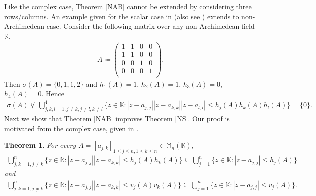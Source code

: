 \documentclass{amsart}
\newtheorem{theorem}{Theorem}[section]
\begin{document}
Like the complex case, Theorem \ref{NAB} cannot be extended by considering three rows/columns. An example given for the scalar case in \cite{VARGA} (also see \cite{NEWMANTHOMPSON, BRUALDI}) extends to non-Archimedean case.  Consider the  following matrix over any non-Archimedean field $\mathbb{K}$. 
\begin{align*}
A\coloneqq 
\begin{pmatrix}
1&1&0&0\\
1&1&0&0\\
0&0&1&0\\
0&0&0&1\\
\end{pmatrix}.
\end{align*}
Then $\sigma(A)=\{0, 1, 1, 2\}$ and $h_1(A)=1$, $h_2(A)=1$, $h_3(A)=0$, $h_4(A)=0$. Hence 
\begin{align*}
	\sigma (A) \nsubseteq \bigcup_{j,k,l=1, j \neq k, j \neq l, k \neq l}^4\{z \in \mathbb{K}: |z-a_{j, j}||z-a_{k,k}||z-a_{l,l}|\leq h_j(A)h_k(A)h_l(A)\}=\{0\}.
\end{align*}
Next we show that Theorem \ref{NAB} improves Theorem \ref{NS}. Our proof is motivated from the complex case, given in \cite{VARGA}.
\begin{theorem}
	For every $A=[a_{j,k}]_{1\leq j\leq n, 1\leq k \leq n}\in  \mathbb{M}_n(\mathbb{K})$, 
	\begin{align*}
	\bigcup_{j,k=1, j \neq k}^n\{z \in \mathbb{K}: |z-a_{j, j}||z-a_{k,k}|\leq h_j(A)h_k(A)\}\subseteq \bigcup_{j=1}^n\{z \in \mathbb{K}: |z-a_{j, j}|\leq h_j(A)\}
	\end{align*}
and 
	\begin{align*}
	\bigcup_{j,k=1, j \neq k}^n\{z \in \mathbb{K}: |z-a_{j, j}||z-a_{k,k}|\leq v_j(A)v_k(A)\}\subseteq \bigcup_{j=1}^n\{z \in \mathbb{K}: |z-a_{j, j}|\leq v_j(A)\}.
\end{align*}
\end{theorem}
\end{document}
